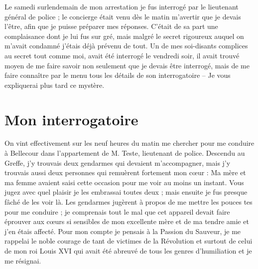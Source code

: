 \documentclass[11pt,a4paper]{report}
\begin{document}
Le samedi surlendemain de mon arrestation je fus interrogé par le lieutenant général de police ; le concierge était venu dès le matin m'avertir que je devais l'être, afin que je puisse préparer mes réponses. C'était de sa part une complaisance dont je lui fus sur gré, mais malgré le secret rigoureux auquel on m'avait condamné j'étais déjà prévenu de tout. Un de mes soi-disants complices au secret tout comme moi, avait été interrogé le vendredi soir, il avait trouvé moyen de me faire savoir non seulement que je devais être interrogé, mais de me faire connaître par le menu tous les détails de son interrogatoire -- Je vous expliquerai plus tard ce mystère.

\section*{Mon interrogatoire}

On vint effectivement sur les neuf heures du matin me chercher pour me conduire à Bellecour dans l'appartement de M. Teste, lieutenant de police. Descendu au Greffe, j'y trouvais deux gendarmes qui devaient m'accompagner, mais j'y trouvais aussi deux personnes qui remuèrent fortement mon cœur : Ma mère et ma femme avaient saisi cette occasion pour me voir au moins un instant. Vous jugez avec quel plaisir je les embrassai toutes deux ; mais ensuite je fus presque fâché de les voir là. Les gendarmes jugèrent à propos de me mettre les pouces tes pour me conduire ; je comprenais tout le mal que cet appareil devait faire éprouver aux cœurs si sensibles de mon excellente mère et de ma tendre amie et j'en étais affecté. Pour mon compte je pensais à la Passion du Sauveur, je me rappelai le noble courage de tant de victimes de la Révolution et surtout de celui de mon roi Louis XVI qui avait été abreuvé de tous les genres d'humiliation et je me résignai.
\end{document}
